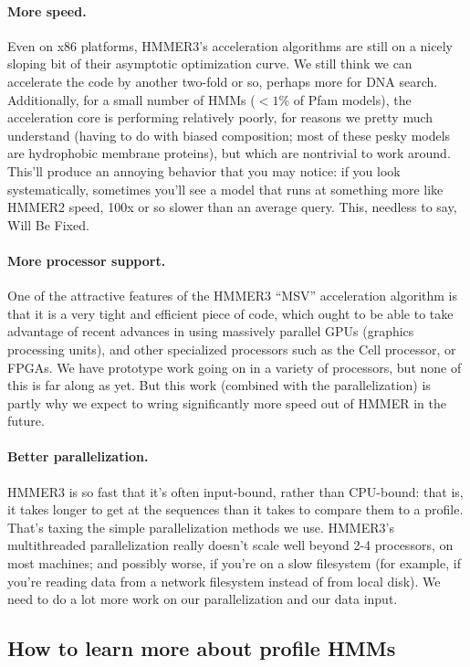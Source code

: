 \paragraph{More speed.} Even on x86 platforms, HMMER3's acceleration
algorithms are still on a nicely sloping bit of their asymptotic
optimization curve. We still think we can accelerate the code by another 
two-fold or so, perhaps more for DNA search. Additionally, for a small number
of HMMs ($<1$\% of Pfam models), the acceleration core is performing relatively
poorly, for reasons we pretty much understand (having to do with biased
composition; most of these pesky models are hydrophobic membrane proteins), but
which are nontrivial to work around. This'll produce an annoying behavior that
you may notice: if you look systematically, sometimes you'll see a model that
runs at something more like HMMER2 speed, 100x or so slower than an average
query. This, needless to say, Will Be Fixed.

\paragraph{More processor support.} One of the attractive features of the
HMMER3 ``MSV'' acceleration algorithm is that it is a very tight and
efficient piece of code, which ought to be able to take advantage of
recent advances in using massively parallel GPUs (graphics processing
units), and other specialized processors such as the Cell processor,
or FPGAs. We have prototype work going on in a variety of processors,
but none of this is far along as yet. But this work (combined with the
parallelization) is partly why we expect to wring significantly more
speed out of HMMER in the future.

\paragraph{Better parallelization.} HMMER3 is so fast that it's often
input-bound, rather than CPU-bound: that is, it takes longer to get at
the sequences than it takes to compare them to a profile. That's
taxing the simple parallelization methods we use. HMMER3's
multithreaded parallelization really doesn't scale well beyond 2-4
processors, on most machines; and possibly worse, if you're on a slow
filesystem (for example, if you're reading data from a network
filesystem instead of from local disk). We need to do a lot more work
on our parallelization and our data input.


\subsection{How to learn more about profile HMMs}

